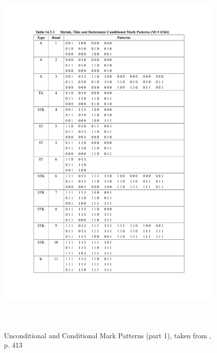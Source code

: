 \documentclass{article}
\begin{document}
\begin{figure}
 \includegraphics[page=1,height=19cm]{images/patternTables.pdf}
 \caption{Unconditional and Conditional Mark Patterns (part 1), taken from \cite{Pratt:2001:DIP:516234}, p. 413}
 \label{fig:markpatterns1}
\end{figure}
\end{document}
